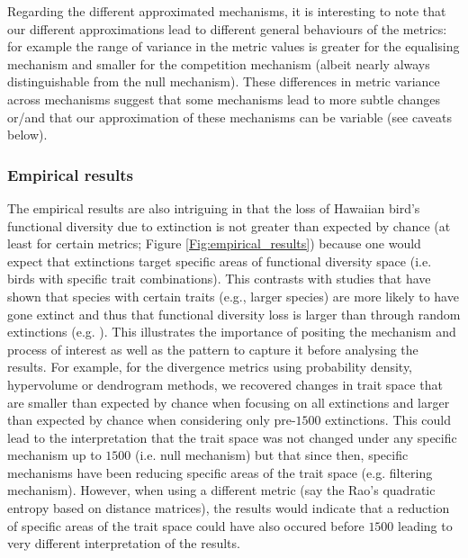 \documentclass[12pt,letterpaper]{article}
\begin{document}
Regarding the different approximated mechanisms, it is interesting to note that our different approximations lead to different general behaviours of the metrics: for example the range of variance in the metric values is greater for the equalising mechanism and smaller for the competition mechanism (albeit nearly always distinguishable from the null mechanism).
These differences in metric variance across mechanisms suggest that some mechanisms lead to more subtle changes or/and that our approximation of these mechanisms can be variable (see caveats below).

\subsubsection{Empirical results}

The empirical results are also intriguing in that the loss of Hawaiian bird's functional diversity due to extinction is not greater than expected by chance (at least for certain metrics; Figure \ref{Fig:empirical_results}) because one would expect that extinctions target specific areas of functional diversity space (i.e. birds with specific trait combinations).
This contrasts with studies that have shown that species with certain traits (e.g., larger species) are more likely to have gone extinct and thus that functional diversity loss is larger than through random extinctions (e.g. \citealt{sayol2021loss,Matthews2022}).
This illustrates the importance of positing the mechanism and process of interest as well as the pattern to capture it before analysing the results.
For example, for the divergence metrics using probability density, hypervolume or dendrogram methods, we recovered changes in trait space that are smaller than expected by chance when focusing on all extinctions and larger than expected by chance when considering only pre-$1500$ extinctions.
This could lead to the interpretation that the trait space was not changed under any specific mechanism up to $1500$ (i.e. null mechanism) but that since then, specific mechanisms have been reducing specific areas of the trait space (e.g. filtering mechanism).
However, when using a different metric (say the Rao's quadratic entropy based on distance matrices), the results would indicate that a reduction of specific areas of the trait space could have also occured before $1500$ leading to very different interpretation of the results.
\end{document}

